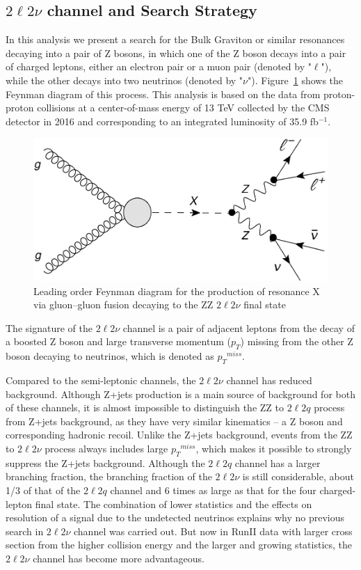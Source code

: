 \subsection{$2\ell 2\nu$ channel and  Search Strategy}
In this analysis we present a search for the Bulk Graviton or similar resonances decaying into a pair of Z bosons, in which one of the Z boson decays into a pair of charged leptons, either an electron pair or a muon pair (denoted by "$\ell$"), while the other decays into two neutrinos (denoted by "$\nu$"). Figure~\ref{fig:intro_llnndiagram} shows the Feynman diagram of this process. This analysis is based on the data from proton-proton collisions at a center-of-mass energy of 13 TeV collected by the CMS detector in 2016 and corresponding to an integrated luminosity of 35.9 fb$^{-1}$. 
\begin{figure}[htbp]
\begin{center}
\includegraphics[width=0.72\linewidth]{figures/intro_llnndiagram.pdf}
\caption{Leading order Feynman diagram for the production of resonance X via gluon–gluon fusion decaying to the ZZ $2\ell 2\nu$ final state}
\label{fig:intro_llnndiagram}
\end{center}
\end{figure}
The signature of the  $2\ell 2\nu$ channel is a pair of adjacent leptons from the decay of a boosted Z boson and large transverse momentum ($p_{T}$) missing from the other Z boson decaying to neutrinos, which is denoted as ${p_{T}}^{miss}$.

\vspace{0.3cm}
Compared to the semi-leptonic channels, the $2\ell 2\nu$ channel has reduced background. Although Z+jets production is a main source of background for both of these channels, it is almost impossible to distinguish the ZZ to $2\ell 2q$ process from Z+jets background, as they have very similar kinematics -- a Z boson and corresponding hadronic recoil. Unlike the Z+jets background, events from the ZZ to $2\ell 2\nu$ process always includes large ${p_{T}}^{miss}$, which makes it possible to strongly suppress the Z+jets background. Although the $2\ell 2q$ channel has a larger branching fraction, the branching fraction of the $2\ell 2\nu$ is still considerable, about 1/3 of that of the $2\ell 2q$ channel and 6 times as large as that for the four charged-lepton final state. The combination of lower statistics and the effects on resolution of a signal due to the undetected neutrinos explains why no previous search in $2\ell 2\nu$ channel was carried out. But now in RunII data with larger cross section from the higher collision energy and the larger and growing statistics, the $2\ell 2\nu$ channel has become more advantageous.

